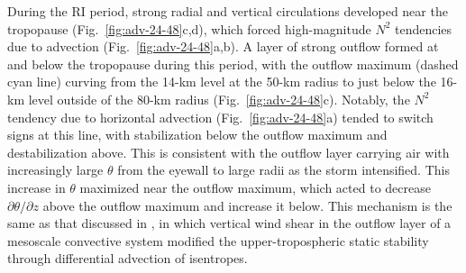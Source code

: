 During the RI period, strong radial and vertical circulations developed near the tropopause (Fig.~\ref{fig:adv-24-48}c,d), which forced high-magnitude $N^2$ tendencies due to advection (Fig.~\ref{fig:adv-24-48}a,b).
A layer of strong outflow formed at and below the tropopause during this period, with the outflow maximum (dashed cyan line) curving from the 14-km level at the 50-km radius to just below the 16-km level outside of the 80-km radius (Fig.~\ref{fig:adv-24-48}c).
Notably, the $N^2$ tendency due to horizontal advection (Fig.~\ref{fig:adv-24-48}a) tended to switch signs at this line, with stabilization below the outflow maximum and destabilization above.
This is consistent with the outflow layer carrying air with increasingly large $\theta$ from the eyewall to large radii as the storm intensified.
This increase in $\theta$ maximized near the outflow maximum, which acted to decrease $\partial \theta/\partial z$ above the outflow maximum and increase it below.
This mechanism is the same as that discussed in \cite{TrierSharman2009}, in which vertical wind shear in the outflow layer of a mesoscale convective system modified the upper-tropospheric static stability through differential advection of isentropes.

